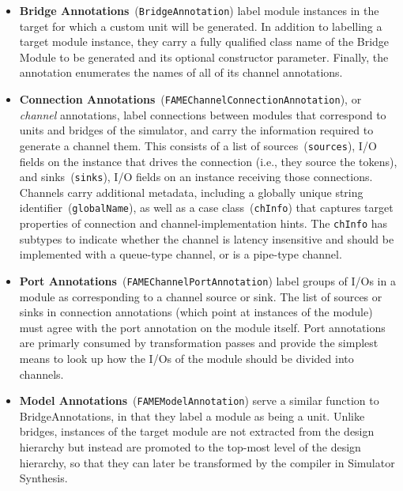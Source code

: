 \begin{itemize}
    \item \textbf{Bridge Annotations}~(\texttt{BridgeAnnotation}) label module
        instances in the target for which a custom unit will be generated.  In
        addition to labelling a target module instance, they carry a fully qualified
        class name of the Bridge Module to be generated and its optional
        constructor parameter. Finally, the annotation enumerates the names of all
        of its channel annotations.

\item \textbf{Connection Annotations}~(\texttt{FAMEChannelConnectionAnnotation}), or \emph{channel} annotations, label connections between modules that correspond to units and bridges of the simulator, and
    carry the information required to generate a channel them. This consists of
    a list of sources~(\texttt{sources}), I/O fields on the instance that drives the connection
    (i.e., they source the tokens), and sinks~(\texttt{sinks}), I/O fields on an instance
    receiving those connections. Channels carry additional metadata,
    including a globally unique string identifier~(\texttt{globalName}), as well as a case class~(\texttt{chInfo}) that
    captures target properties of connection and channel-implementation hints.
    The \texttt{chInfo} has subtypes to indicate whether the channel is latency
    insensitive and should be implemented with a queue-type channel, or is a pipe-type channel.

\item \textbf{Port Annotations}~(\texttt{FAMEChannelPortAnnotation}) label groups of I/Os in a module as corresponding to a channel source or sink.
    The list of sources or sinks in connection annotations (which point
    at instances of the module) must agree with the port annotation on the
    module itself. Port annotations are primarly consumed by transformation passes and provide the simplest means
    to look up how the I/Os of the module should be divided into channels.

\item \textbf{Model Annotations}~(\texttt{FAMEModelAnnotation}) serve a similar function to BridgeAnnotations, in that they label a
    module as being a unit. Unlike bridges, instances of the target module
    are not extracted from the design hierarchy but instead are promoted to
    the top-most level of the design hierarchy, so that they can later be
    transformed by the compiler in Simulator Synthesis.
\end{itemize}

